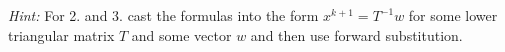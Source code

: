 \textit{Hint:} For 2. and 3. cast the formulas into the form $x^{k+1}=T^{-1}w$ for some lower triangular matrix $T$ and some vector $w$ and then use forward substitution.\\~\\
